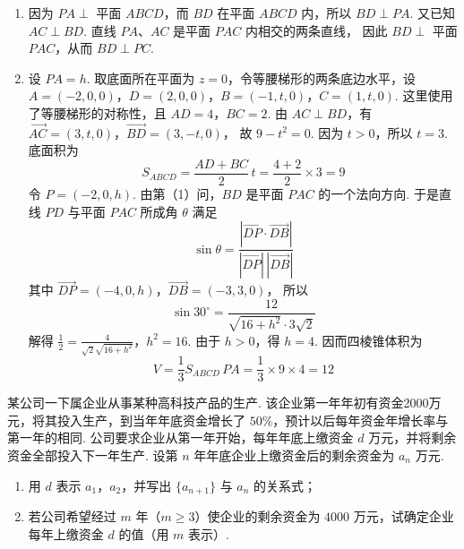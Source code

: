 \begin{solution}
\begin{enumerate}
\item 因为 \(PA\perp\) 平面 \(ABCD\)，而 \(BD\) 在平面 \(ABCD\) 内，所以
\(BD\perp PA\). 又已知 \(AC\perp BD\). 直线 \(PA\)、\(AC\) 是平面 \(PAC\) 内相交的两条直线，
因此 \(BD\perp\) 平面 \(PAC\)，从而 \(BD\perp PC\).
\item 设 \(PA=h\). 取底面所在平面为 \(z=0\)，令等腰梯形的两条底边水平，设
\(A=(-2,0,0)\)，\(D=(2,0,0)\)，\(B=(-1,t,0)\)，\(C=(1,t,0)\).
这里使用了等腰梯形的对称性，且 \(AD=4\)，\(BC=2\). 由 \(AC\perp BD\)，有
\(\overrightarrow{AC}=(3,t,0)\)，\(\overrightarrow{BD}=(3,-t,0)\)，
故 \(9-t^2=0\). 因为 \(t>0\)，所以 \(t=3\). 底面积为
\[
S_{ABCD}=\frac{AD+BC}{2}\,t=\frac{4+2}{2}\times3=9
\]
令 \(P=(-2,0,h)\). 由第（1）问，\(BD\) 是平面 \(PAC\) 的一个法向方向. 于是直线 \(PD\) 与平面 \(PAC\) 所成角 \(\theta\) 满足
\[
\sin\theta
=\frac{\left|\overrightarrow{DP}\cdot\overrightarrow{DB}\right|}
{|\overrightarrow{DP}|\,|\overrightarrow{DB}|}
\]
其中
\(\overrightarrow{DP}=(-4,0,h)\)，\(\overrightarrow{DB}=(-3,3,0)\)，
所以
\[
\sin30^\circ
=\frac{12}{\sqrt{16+h^2}\cdot3\sqrt2}
\]
解得
\(\frac12=\frac{4}{\sqrt{2}\sqrt{16+h^2}}\)，\(h^2=16\).
由于 \(h>0\)，得 \(h=4\). 因而四棱锥体积为
\[
V=\frac13S_{ABCD}\,PA=\frac13\times9\times4=12
\]
\end{enumerate}
\end{solution}

\begin{problem}
某公司一下属企业从事某种高科技产品的生产. 该企业第一年年初有资金2000万元，将其投入生产，到当年年底资金增长了 \(50\%\)，预计以后每年资金年增长率与第一年的相同. 公司要求企业从第一年开始，每年年底上缴资金 \(d\) 万元，并将剩余资金全部投入下一年生产. 设第 \(n\) 年年底企业上缴资金后的剩余资金为 \(a_{n}\) 万元.
\begin{enumerate}
\item 用 \(d\) 表示 \(a_{1}\)，\(a_{2}\)，并写出 \( \{a_{n+1}\} \) 与 \( a_{n} \) 的关系式；
\item 若公司希望经过 \(m\) 年（\(m \geqslant 3\)）使企业的剩余资金为 \(4000\) 万元，试确定企业每年上缴资金 \(d\) 的值（用 \(m\) 表示）.
\end{enumerate}

\end{problem}


